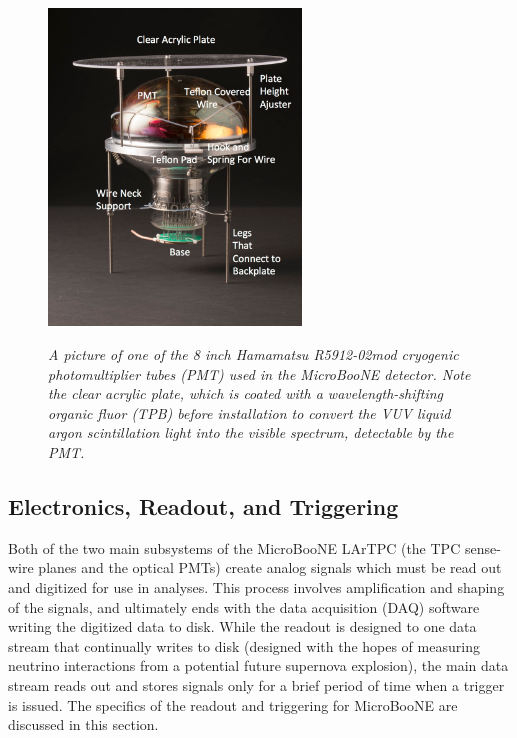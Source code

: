 \begin{figure}[ht!]
\centering
	\includegraphics[width=0.6\textwidth]{Figures/mount_PMT_labeled.png} \\
\caption{\textit{A picture of one of the 8 inch Hamamatsu R5912-02mod cryogenic photomultiplier tubes (PMT) used in the MicroBooNE detector. Note the clear acrylic plate, which is coated with a wavelength-shifting organic fluor (TPB) before installation to convert the VUV liquid argon scintillation light into the visible spectrum, detectable by the PMT.}}\label{pmt_mount_fig}
\end{figure}


\subsection{Electronics, Readout, and Triggering}
Both of the two main subsystems of the MicroBooNE LArTPC (the TPC sense-wire planes and the optical PMTs) create analog signals which must be read out and digitized for use in analyses. This process involves amplification and shaping of the signals, and ultimately ends with the data acquisition (DAQ) software writing the digitized data to disk. While the readout is designed to one data stream that continually writes to disk (designed with the hopes of measuring neutrino interactions from a potential future supernova explosion), the main data stream reads out and stores signals only for a brief period of time when a trigger is issued. The specifics of the readout and triggering for MicroBooNE are discussed in this section.


